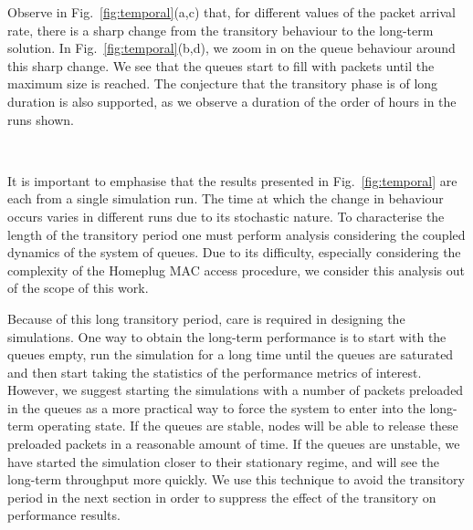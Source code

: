 \documentclass[preprint,12pt]{elsarticle}
\begin{document}
Observe in Fig.~\ref{fig:temporal}(a,c) that, for different values of the packet arrival rate, there is a sharp change from the transitory behaviour to the long-term solution. In Fig.~\ref{fig:temporal}(b,d), we zoom in on the queue behaviour around this sharp change. We see that the queues start to fill with packets until the maximum size is reached. The conjecture that the transitory phase is of long duration is also supported, as we observe a duration of the order of hours in the runs shown.

\begin{figure*}[th!!!!!]
\centering


\\

\caption{Evolution of throughput and queue size (CA3/2,  nodes).}
\label{fig:temporal}
\end{figure*}


It is important to emphasise that the results presented in Fig.~\ref{fig:temporal} are each from a single simulation run. The time at which the change in behaviour occurs varies in different runs due to its stochastic nature. To characterise the length of the transitory period one must perform analysis considering the coupled dynamics of the system of queues. Due to its difficulty, especially considering the complexity of the Homeplug MAC access procedure, we consider this analysis out of the scope of this work.

Because of this long transitory period, care is required in designing the simulations. One way to obtain the long-term performance is to start with the queues empty, run the simulation for a long time until the queues are saturated and then start taking the statistics of the performance metrics of interest. However, we suggest starting the simulations with a number of packets preloaded in the queues as a more practical way to force the system to enter into the long-term operating state. If the queues are stable, nodes will be able to release these preloaded packets in a reasonable amount of time. If the queues are unstable, we have started the simulation closer to their stationary regime, and will see the long-term throughput more quickly. We use this technique to avoid the transitory period in the next section in order to suppress the effect of the transitory on performance results.
\end{document}
